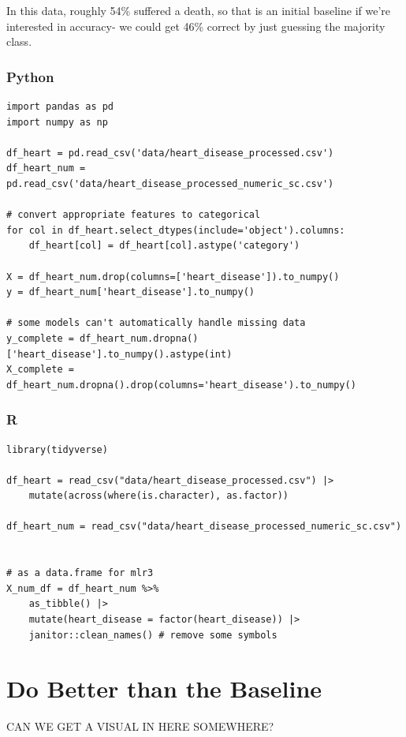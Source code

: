 \documentclass[
  letterpaper,
]{krantz}
\begin{document}
In this data, roughly 54\% suffered a death, so that is an initial
baseline if we're interested in accuracy- we could get 46\% correct by
just guessing the majority class.

\subsubsection{Python}

\begin{verbatim}
import pandas as pd
import numpy as np

df_heart = pd.read_csv('data/heart_disease_processed.csv')
df_heart_num = pd.read_csv('data/heart_disease_processed_numeric_sc.csv')

# convert appropriate features to categorical
for col in df_heart.select_dtypes(include='object').columns:
    df_heart[col] = df_heart[col].astype('category')

X = df_heart_num.drop(columns=['heart_disease']).to_numpy()
y = df_heart_num['heart_disease'].to_numpy()

# some models can't automatically handle missing data
y_complete = df_heart_num.dropna()['heart_disease'].to_numpy().astype(int)
X_complete = df_heart_num.dropna().drop(columns='heart_disease').to_numpy()
\end{verbatim}

\subsubsection{R}

\begin{verbatim}
library(tidyverse)

df_heart = read_csv("data/heart_disease_processed.csv") |> 
    mutate(across(where(is.character), as.factor))

df_heart_num = read_csv("data/heart_disease_processed_numeric_sc.csv")


# as a data.frame for mlr3
X_num_df = df_heart_num %>%
    as_tibble() |> 
    mutate(heart_disease = factor(heart_disease)) |> 
    janitor::clean_names() # remove some symbols
\end{verbatim}

\section{Do Better than the Baseline}\label{sec-ml-baseline}

CAN WE GET A VISUAL IN HERE SOMEWHERE?
\end{document}
